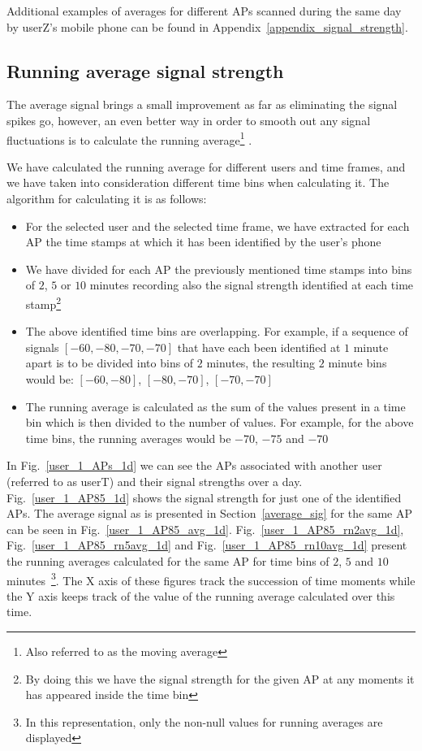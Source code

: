 Additional examples of averages for different APs scanned during the same day by
userZ's mobile phone can be found in Appendix~\ref{appendix_signal_strength}.

\subsection{Running average signal strength}
The average signal brings a small improvement as far as eliminating the signal
spikes go, however, an even better way in order to smooth out any signal
fluctuations is to calculate the running average\footnote{Also referred to as
the moving average} \cite{Hyndman09movingaverages}.

We have calculated the running average for different users and time frames, and
we have taken into consideration different time bins when calculating it.
The algorithm for calculating it is as follows:
\begin{itemize}
  \item For the selected user and the selected time frame, we have extracted for
  each AP the time stamps at which it has been identified by the user's phone
  \item We have divided for each AP the previously mentioned time stamps into
  bins of $2$, $5$ or $10$ minutes recording also the signal
  strength identified at each time stamp\footnote{By doing this we have the
  signal strength for the given AP at any moments it has appeared inside the time bin}
  \item The above identified time bins are overlapping. For example, if a
  sequence of signals $[-60, -80, -70, -70]$ that have each been identified at $1$ minute
  apart is to be divided into bins of $2$ minutes, the resulting $2$
  minute bins would be: $[-60, -80]$, $[-80, -70]$, $[-70, -70]$
  \item The running average is calculated as the sum of the values present in a
  time bin which is then divided to the number of values. For example, for the
  above time bins, the running averages would be $-70$, $-75$ and $-70$
\end{itemize}

In Fig.~\ref{user_1_APs_1d} we can see the APs associated with another user
(referred to as userT) and their signal strengths over a day.
Fig.~\ref{user_1_AP85_1d} shows the signal strength for just one of the
identified APs. The average signal as is presented in Section~\ref{average_sig}
for the same AP can be seen in Fig.~\ref{user_1_AP85_avg_1d}.
Fig.~\ref{user_1_AP85_rn2avg_1d}, Fig.~\ref{user_1_AP85_rn5avg_1d} and
Fig.~\ref{user_1_AP85_rn10avg_1d} present the running averages calculated for
the same AP for time bins of $2$, $5$ and $10$ minutes~\footnote{In this
representation, only the non-null values for running averages are displayed}.
The X axis of these figures track the succession of time moments while the Y
axis keeps track of the value of the running average calculated over this time.

